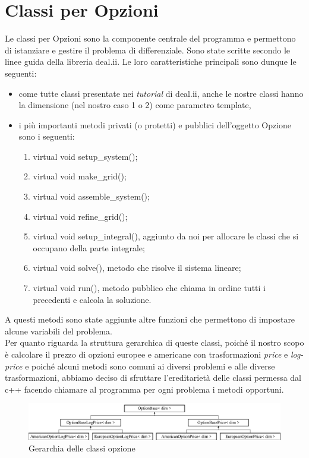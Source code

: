 \documentclass[a4paper,10pt]{report}
\theoremstyle{plain}
\theoremstyle{definition}
\theoremstyle{remark}
\begin{document}
\section{Classi per Opzioni}
Le classi per Opzioni sono la componente centrale del programma e permettono di istanziare e gestire il problema di differenziale. Sono state scritte secondo le linee guida della libreria \textsf{deal.ii}. Le loro caratteristiche principali sono dunque le seguenti:
\begin{itemize}
\item {come tutte classi presentate nei \emph{tutorial} di \textsf{deal.ii}, anche le nostre classi hanno la dimensione (nel nostro caso 1 o 2) come parametro \textsf{template},}
\item {i pi\`u importanti metodi privati (o protetti) e pubblici dell'oggetto Opzione sono i seguenti:}
\begin{enumerate}
\item \textsf{virtual void setup\_system()};
\item \textsf{virtual void make\_grid()};
\item \textsf{virtual void assemble\_system()};
\item \textsf{virtual void refine\_grid()};
\item \textsf{virtual void setup\_integral()}, aggiunto da noi per allocare le classi che si occupano della parte integrale;
\item \textsf{virtual void solve()}, metodo che risolve il sistema lineare;
\item \textsf{virtual void run()}, metodo pubblico che chiama in ordine tutti i precedenti e calcola la soluzione.
\end{enumerate}
\end{itemize}
A questi metodi sono state aggiunte altre funzioni che permettono di impostare alcune variabili del problema.\\Per quanto riguarda la struttura gerarchica di queste classi, poich\'e il nostro scopo \`e calcolare il prezzo di opzioni europee e americane con trasformazioni \emph{price} e \emph{log-price} e poich\'e alcuni metodi sono comuni ai diversi problemi e alle diverse trasformazioni, abbiamo deciso di sfruttare l'ereditariet\`a delle classi permessa dal c++ facendo chiamare al programma per ogni problema i metodi opportuni.
\begin{figure}[h!]
\begin{center}
\includegraphics[width=12cm]{img/classOptionBase.eps}
\caption{Gerarchia delle classi opzione}
\end{center}
\label{optionbase}
\end{figure}
\end{document}
